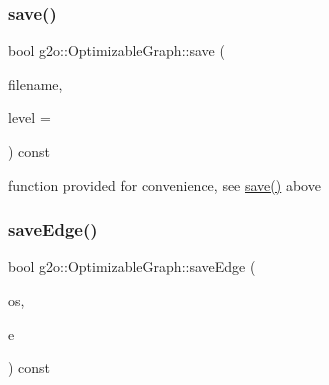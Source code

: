 \mbox{\label{structg2o_1_1_optimizable_graph_a29c40a9cb3bf3660e59d55cfad264c71}} 
\subsubsection{\texorpdfstring{save()}{save()}\hspace{0.1cm}{\footnotesize\ttfamily [2/2]}}
{\footnotesize\ttfamily bool g2o\+::\+Optimizable\+Graph\+::save (\begin{DoxyParamCaption}\item[{const char $\ast$}]{filename,  }\item[{int}]{level = {} }\end{DoxyParamCaption}) const}



function provided for convenience, see \mbox{\hyperlink{structg2o_1_1_optimizable_graph_abee0b60ade0644904a489564def8ad1d}{save()}} above 

\mbox{\label{structg2o_1_1_optimizable_graph_a3852abe611f2fd90a0a05979987615a2}} 
\subsubsection{\texorpdfstring{save\+Edge()}{saveEdge()}}
{\footnotesize\ttfamily bool g2o\+::\+Optimizable\+Graph\+::save\+Edge (\begin{DoxyParamCaption}\item[{std\+::ostream \&}]{os,  }\item[{\mbox{\hyperlink{classg2o_1_1_optimizable_graph_1_1_edge}{Optimizable\+Graph\+::\+Edge}} $\ast$}]{e }\end{DoxyParamCaption}) const}

\mbox{\label{structg2o_1_1_optimizable_graph_adcf211f9c7bf3ee9dab65b130807402c}} 
